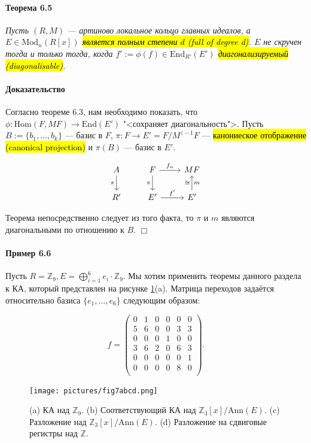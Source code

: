 \documentclass[a4paper,12pt]{article}
\newcommand{\Ann}{\text{Ann}}
\newcommand{\Endom}{\text{End}}
\newcommand{\Hom}{\text{Hom}}
\newcommand{\Mod}{\text{Mod}}
\begin{document}
\paragraph{Теорема 6.5}
{\itshape
Пусть $(R,M )$ --- артиново локальное кольцо главных идеалов, а $E \in \Mod_n(R[x])$ \hl{является полным степени $d$ (full of degree d)}. $E$ не скручен тогда и только тогда, когда $f' := \phi (f) \in \Endom_{R'}(E')$ \hl{диагонализируемый (diagonalisable)}.
}

\paragraph{Доказательство}
Согласно теореме 6.3, нам необходимо показать, что $\phi: \Hom(F,MF) \rightarrow \Endom(E')$ "<сохраняет диагональность">. Пусть $B:=\{b_1, ..., b_k\}$ --- базис в $F$, $\pi : F \rightarrow E' = F/M^{z-1}F$ --- \hl{канониеское отображение (canonical projection)} и $\pi(B)$ --- базис в $E'$.

$$
\begin{tikzcd}
	A \dar[']{\pi} & F \dar[']{\pi} \rar{f_\alpha} & MF \\
	R' & E' \rar{f'} & E' \uar{\cong}[']{m}
\end{tikzcd}
$$

Теорема непосредственно следует из того факта, то $\pi$ и $m$ являются диагональными по отношению к $B$. $\Box$



\paragraph{Пример 6.6}
Пусть $R = \mathbb{Z}_9, E= \bigoplus_{i=1}^6 e_i \cdot \mathbb{Z}_9$. Мы хотим применить теоремы данного раздела к КА, который представлен на рисунке \ref{fig7abcd}(a). Матрица переходов задаётся относительно базиса $\{e_1, ..., e_6\}$ следующим образом:

$$
f = \begin{pmatrix}
	 0& 1& 0& 0& 0& 0\\
	 5& 6& 0& 0& 3& 3\\
	 0& 0& 0& 1& 0& 0\\
	 3& 6& 2& 0& 6& 3\\
	 0& 0& 0& 0& 0& 1\\
	 0& 0& 0& 0& 8& 0\\
\end{pmatrix}.
$$

\begin{figure}[h]
	\centering
	\texttt{[image: pictures/fig7abcd.png]}
	\caption{(a) КА над $\mathbb{Z}_9$. (b) Соответствующий КА над $\mathbb{Z}_3[x]/\Ann(E)$. (c) Разложение над $\mathbb{Z}_3[x]/\Ann(E)$. (d) Разложение на сдвиговые регистры над $\mathbb{Z}$.}
	\label{fig7abcd}
\end{figure}
\end{document}
